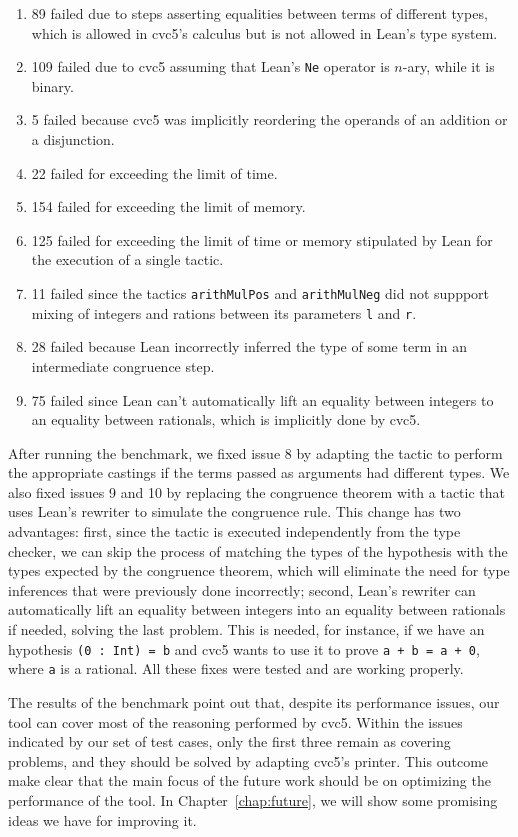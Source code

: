 \begin{enumerate}
  \item 89 failed due to steps asserting equalities between terms of different types, which is allowed in cvc5's calculus but is not allowed in Lean's type system.
  \item 109 failed due to cvc5 assuming that Lean's \texttt{Ne} operator is $n$-ary, while it is binary.
  \item 5 failed because cvc5 was implicitly reordering the operands of an addition or a disjunction.
  \item 22 failed for exceeding the limit of time.
  \item 154 failed for exceeding the limit of memory.
  \item 125 failed for exceeding the limit of time or memory stipulated by Lean for the execution of a single tactic.
  \item 11 failed since the tactics \texttt{arithMulPos} and \texttt{arithMulNeg} did not suppport mixing of integers and rations between its parameters \texttt{l} and \texttt{r}.
  \item 28 failed because Lean incorrectly inferred the type of some term in an intermediate congruence step.
  \item 75 failed since Lean can't automatically lift an equality between integers to an equality between rationals, which is implicitly done by cvc5.
\end{enumerate}

After running the benchmark, we fixed issue 8 by adapting the tactic to perform the
appropriate castings if the terms passed as arguments had different types. We also
fixed issues 9 and 10 by replacing the congruence theorem with a tactic that uses
Lean's rewriter to simulate the congruence rule.
This change has two advantages: first, since the tactic is executed independently from the type checker, we can skip the process
of matching the types of the hypothesis with the types expected by the congruence theorem, which will
eliminate the need for type inferences that were previously done incorrectly; second, Lean's rewriter
can automatically lift an equality between integers into an equality between rationals if needed, solving
the last problem. This is needed, for instance, if we have an hypothesis \texttt{(0 : Int) = b}
and cvc5 wants to use it to prove \texttt{a + b = a + 0}, where \texttt{a}
is a rational. All these fixes were tested and are working properly.

The results of the benchmark point out that, despite its performance issues, our tool can
cover most of the reasoning performed by cvc5. Within the issues indicated by our set of
test cases, only the first three remain as covering problems, and they should be solved
by adapting cvc5's printer. This outcome make clear that the main focus of the future work
should be on optimizing the performance of the tool. In Chapter~\ref{chap:future}, we
will show some promising ideas we have for improving it.


